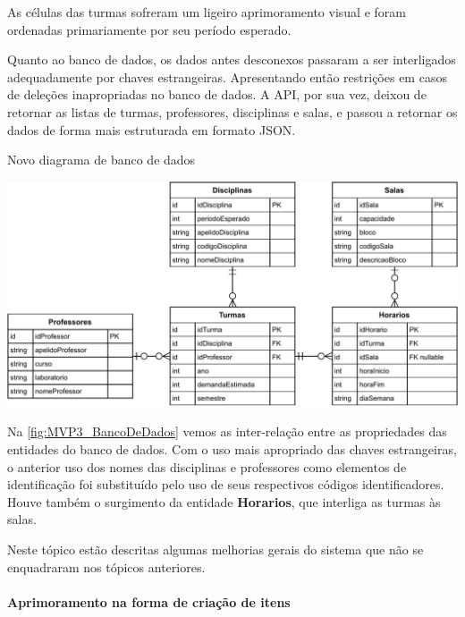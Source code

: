 As células das turmas sofreram um ligeiro aprimoramento visual e foram ordenadas primariamente por seu período esperado.

 \label{ssssec:Banco de dados}

Quanto ao banco de dados, os dados antes desconexos passaram a ser interligados adequadamente por chaves estrangeiras. Apresentando então restrições em casos de deleções inapropriadas no banco de dados. A API, por sua vez, deixou de retornar as listas de turmas, professores, disciplinas e salas, e passou a retornar os dados de forma mais estruturada em formato JSON.

\begin{MyCenteredFigure} \caption{Novo diagrama de banco de dados} \label{fig:MVP3_BancoDeDados}
  \includegraphics[width=\textwidth]{files/img/2.02!5-desenvolvimento/2.02!5.1.4-sistema/diagramas/Diagrama_ER-How_it_should_be}
\end{MyCenteredFigure}

Na \autoref{fig:MVP3_BancoDeDados} vemos as inter-relação entre as propriedades das entidades do banco de dados. Com o uso mais apropriado das chaves estrangeiras, o anterior uso dos nomes das disciplinas e professores como elementos de identificação foi substituído pelo uso de seus respectivos códigos identificadores. Houve também o surgimento da entidade \textbf{Horarios}, que interliga as turmas às salas.

 \label{ssssec:Gerais}

Neste tópico estão descritas algumas melhorias gerais do sistema que não se enquadraram nos tópicos anteriores.

\paragraph*{Aprimoramento na forma de criação de itens}


